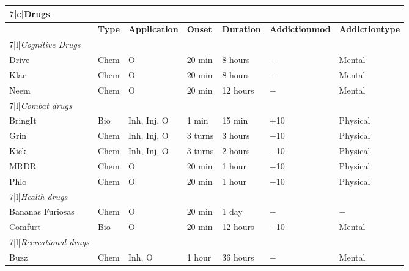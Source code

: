 \begin{table} \begin{tabularx}{\hline}{|X|l|l|l|l|X|X|} \hline

\hline{7}{|c|}{\textbf{Drugs}}	\\ \hline

&\textbf{Type}	&\textbf{Application}	&\textbf{Onset}	&\textbf{Duration}	&\textbf{Addiction\newline mod}	&\textbf{Addiction\hline type} \\ \hline

\hline{7}{|l|}{\emph{Cognitive Drugs}}	\\ \hline

Drive	&Chem	&O	&20 min &8 hours	&$-$	&Mental	\\ \hline

Klar	&Chem	&O	&20 min	&8 hours	&$-$	&Mental	\\ \hline

Neem	&Chem	&O	&20 min	&12 hours	&$-$	&Mental	\\ \hline

\hline{7}{|l|}{\emph{Combat drugs}}	\\ \hline

BringIt	&Bio	&Inh, Inj, O	&1 min	&15 min	&+10	&Physical	\\ \hline

Grin	&Chem	&Inh, Inj, O	&3 turns	&3 hours	&$-$10	&Physical	\\ \hline

Kick	&Chem	&Inh, Inj, O	&3 turns	&2 hours	&$-$10	&Physical	\\ \hline

MRDR	&Chem	&O	&20 min	&1 hour	&$-$10	&Physical	\\ \hline

Phlo	&Chem	&O	&20 min	&1 hour	&$-$10	&Physical	\\ \hline

\hline{7}{|l|}{\emph{Health drugs}}	\\ \hline

Bananas Furiosas	&Chem	&O	&20 min	&1 day	&$-$	&$-$	\\ \hline

Comfurt	&Bio	&O	&20 min	&12 hours	&$-$10	&Mental	\\ \hline

\hline{7}{|l|}{\emph{Recreational drugs}}	\\ \hline

Buzz	&Chem	&Inh, O	&1 hour	&36 hours	&$-$	&Mental	\\ \hline


\end{tabularx}
\end{table}
